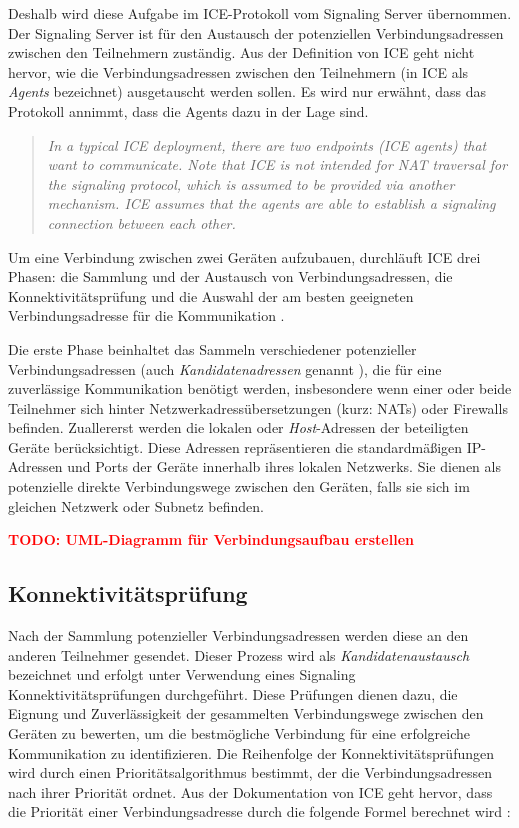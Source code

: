 Deshalb wird diese Aufgabe im ICE-Protokoll vom Signaling Server übernommen. Der Signaling Server ist für den Austausch der potenziellen Verbindungsadressen zwischen den Teilnehmern zuständig. Aus der Definition von ICE geht nicht hervor, wie die Verbindungsadressen zwischen den Teilnehmern (in ICE als \textit{Agents} bezeichnet) ausgetauscht werden sollen. Es wird nur erwähnt, dass das Protokoll annimmt, dass die Agents dazu in der Lage sind.

\begin{quote}
    \textit{In a typical ICE deployment, there are two endpoints (ICE agents)
    that want to communicate. Note that ICE is not intended for NAT
    traversal for the signaling protocol, which is assumed to be provided
    via another mechanism. ICE assumes that the agents are able to
    establish a signaling connection between each other.} \parencite[S. 7]{rfc8445_ICE}
\end{quote}


Um eine Verbindung zwischen zwei Geräten aufzubauen, durchläuft ICE drei Phasen: die Sammlung und der Austausch von Verbindungsadressen, die Konnektivitätsprüfung und die Auswahl der am besten geeigneten Verbindungsadresse für die Kommunikation \parencite[S. 7 ff.]{rfc8445_ICE}.


Die erste Phase beinhaltet das Sammeln verschiedener potenzieller Verbindungsadressen (auch \textit{Kandidatenadressen} genannt \parencite[S. 8]{rfc8445_ICE}), die für eine zuverlässige Kommunikation benötigt werden, insbesondere wenn einer oder beide Teilnehmer sich hinter Netzwerkadressübersetzungen (kurz: NATs) oder Firewalls befinden. Zuallererst werden die lokalen oder \textit{Host}-Adressen der beteiligten Geräte berücksichtigt. Diese Adressen repräsentieren die standardmäßigen IP-Adressen und Ports der Geräte innerhalb ihres lokalen Netzwerks. Sie dienen als potenzielle direkte Verbindungswege zwischen den Geräten, falls sie sich im gleichen Netzwerk oder Subnetz befinden.




\textbf{\textcolor{red}{TODO: UML-Diagramm für Verbindungsaufbau erstellen}}


\subsection{Konnektivitätsprüfung}

Nach der Sammlung potenzieller Verbindungsadressen werden diese an den anderen Teilnehmer gesendet. Dieser Prozess wird als \textit{Kandidatenaustausch} bezeichnet und erfolgt unter Verwendung eines Signaling
Konnektivitätsprüfungen durchgeführt. Diese Prüfungen dienen dazu, die Eignung und Zuverlässigkeit der gesammelten Verbindungswege zwischen den Geräten zu bewerten, um die bestmögliche Verbindung für eine erfolgreiche Kommunikation zu identifizieren. Die Reihenfolge der Konnektivitätsprüfungen wird durch einen Prioritätsalgorithmus bestimmt, der die Verbindungsadressen nach ihrer Priorität ordnet. Aus der Dokumentation von ICE geht hervor, dass die Priorität einer Verbindungsadresse durch die folgende Formel berechnet wird \parencite[S. 22]{rfc8445_ICE}:

